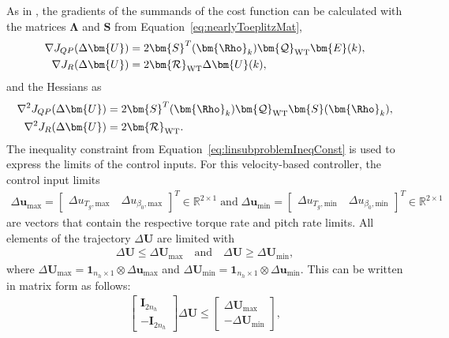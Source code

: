 As in \cite{gonzalez2020nonlinear}, the gradients of the summands of the cost function can be calculated with the matrices $\bm{\Lambda}$ and $\bm{S}$ from Equation~\eqref{eq:nearlyToeplitzMat},
\begin{align*}
    \nabla J_{QP}(\Delta \bm{U}) &= 2\bm{S}^T(\bm{\Rho}_k) \bm{\mathcal{Q}}_{\text{WT}} \bm{E}(k),\\
    \nabla J_R(\Delta \bm{U}) &= 2 \bm{\mathcal{R}}_{\text{WT}} \Delta \bm{U}(k),
\end{align*}
and the Hessians as
\begin{align*}
    \nabla^2 J_{QP}(\Delta \bm{U}) &= 2\bm{S}^T(\bm{\Rho}_k) \bm{\mathcal{Q}}_{\text{WT}} \bm{S}(\bm{\Rho}_k),\\
    \nabla^2 J_R(\Delta \bm{U}) &= 2 \bm{\mathcal{R}}_{\text{WT}}.
\end{align*}
The inequality constraint from Equation~\eqref{eq:linsubproblemIneqConst} is used to express the limits of the control inputs. For this velocity-based controller, the control input limits
\begin{align*}
    \Delta \bm{u}_{\text{max}} = \begin{bmatrix} \Delta u_{T_g, \text{max}} \quad \Delta u_{\beta_0, \text{max}} \end{bmatrix}^T \in \mathbb{R}^{2 \times 1} \; \text{and}\;
    \Delta \bm{u}_{\text{min}} = \begin{bmatrix} \Delta u_{T_g, \text{min}} \quad \Delta u_{\beta_0, \text{min}} \end{bmatrix}^T \in \mathbb{R}^{2 \times 1}
\end{align*}
are vectors that contain the respective torque rate and pitch rate limits. All elements of the trajectory $\Delta \bm{U}$ are limited with
\begin{align*}
    \Delta \bm{U} \leq \Delta \bm{U}_{\text{max}} \quad \text{and} \quad \Delta \bm{U} \geq \Delta \bm{U}_{\text{min}},
\end{align*}
where $\Delta \bm{U}_{\text{max}} = \bm{1}_{n_h \times 1}\otimes \Delta \bm{u}_{\text{max}}$ and $\Delta \bm{U}_{\text{min}} = \bm{1}_{n_h \times 1}\otimes \Delta \bm{u}_{\text{min}}$.
This can be written in matrix form as follows:
\begin{align*}
    \begin{bmatrix}
        \bm{I}_{2n_h} \\
        -\bm{I}_{2n_h}
    \end{bmatrix} \Delta \bm{U} \leq
    \begin{bmatrix}
        \Delta \bm{U}_{\text{max}} \\
        -\Delta \bm{U}_{\text{min}}\end{bmatrix},
\end{align*}

